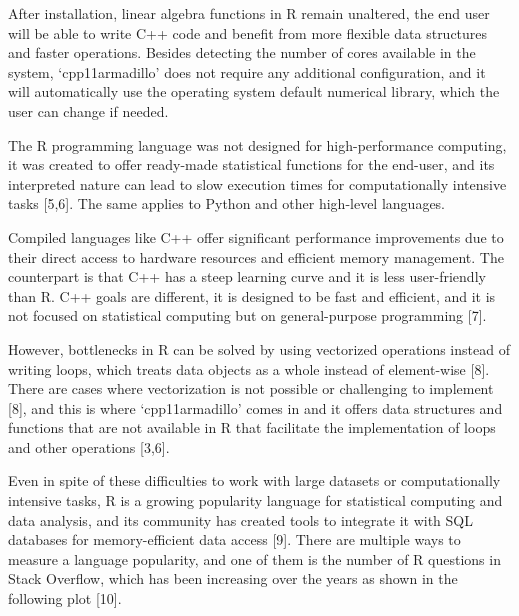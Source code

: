 \documentclass[preprint,12pt, a4paper]{elsarticle}
\begin{document}
After installation, linear algebra functions in R remain unaltered, the
end user will be able to write C++ code and benefit from more flexible
data structures and faster operations. Besides detecting the number of
cores available in the system, `cpp11armadillo' does not require any
additional configuration, and it will automatically use the operating
system default numerical library, which the user can change if needed.

The R programming language was not designed for high-performance
computing, it was created to offer ready-made statistical functions for
the end-user, and its interpreted nature can lead to slow execution
times for computationally intensive tasks {[}5,6{]}. The same applies to
Python and other high-level languages.

Compiled languages like C++ offer significant performance improvements
due to their direct access to hardware resources and efficient memory
management. The counterpart is that C++ has a steep learning curve and
it is less user-friendly than R. C++ goals are different, it is designed
to be fast and efficient, and it is not focused on statistical computing
but on general-purpose programming {[}7{]}.

However, bottlenecks in R can be solved by using vectorized operations
instead of writing loops, which treats data objects as a whole instead
of element-wise {[}8{]}. There are cases where vectorization is not
possible or challenging to implement {[}8{]}, and this is where
`cpp11armadillo' comes in and it offers data structures and functions
that are not available in R that facilitate the implementation of loops
and other operations {[}3,6{]}.

Even in spite of these difficulties to work with large datasets or
computationally intensive tasks, R is a growing popularity language for
statistical computing and data analysis, and its community has created
tools to integrate it with SQL databases for memory-efficient data
access {[}9{]}. There are multiple ways to measure a language
popularity, and one of them is the number of R questions in Stack
Overflow, which has been increasing over the years as shown in the
following plot {[}10{]}.
\end{document}
